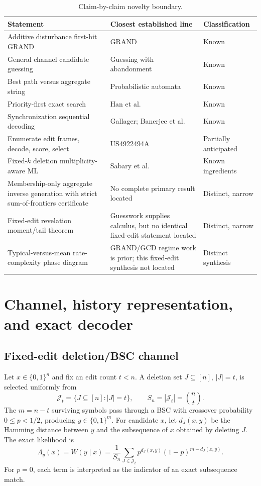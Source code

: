 \documentclass[11pt]{article}
\theoremstyle{definition}
\theoremstyle{remark}
\newcommand{\J}{\mathcal J}
\begin{document}
\begin{table}[t]
\centering
\caption{Claim-by-claim novelty boundary.}
\small
\begin{tabularx}{\textwidth}{@{}p{}p{}X@{}}
\toprule
Statement & Closest established line & Classification \\
\midrule
Additive disturbance first-hit GRAND & GRAND \cite{Duffy2019} & Known \\
General channel candidate guessing & Guessing with abandonment \cite{TanJoudeh2025} & Known \\
Best path versus aggregate string & Probabilistic automata \cite{HigueraOncina2014} & Known \\
Priority-first exact search & Han et al. \cite{Han1993} & Known \\
Synchronization sequential decoding & Gallager; Banerjee et al. \cite{Gallager1961,Banerjee2022} & Known \\
Enumerate edit frames, decode, score, select & US4922494A \cite{US4922494} & Partially anticipated \\
Fixed-$k$ deletion multiplicity-aware ML & Sabary et al. \cite{Sabary2022} & Known ingredients \\
Membership-only aggregate inverse generation with strict sum-of-frontiers certificate & No complete primary result located & Distinct, narrow \\
Fixed-edit revelation moment/tail theorem & Guesswork supplies calculus, but no identical fixed-edit statement located & Distinct, narrow \\
Typical-versus-mean rate-complexity phase diagram & GRAND/GCD regime work is prior; this fixed-edit synthesis not located & Distinct synthesis \\
\bottomrule
\end{tabularx}
\end{table}

\section{Channel, history representation, and exact decoder}
\subsection{Fixed-edit deletion/BSC channel}
Let $x\in\{0,1\}^n$ and fix an edit count $t<n$.  A deletion set $J\subseteq[n]$, $|J|=t$, is selected uniformly from
\[
\J_t=\{J\subseteq[n]:|J|=t\},\qquad S_n=|\J_t|=\binom nt.
\]
The $m=n-t$ surviving symbols pass through a BSC with crossover probability $0\le p<1/2$, producing $y\in\{0,1\}^m$.  For candidate $x$, let $d_J(x,y)$ be the Hamming distance between $y$ and the subsequence of $x$ obtained by deleting $J$.  The exact likelihood is
\begin{equation}
\Lambda_y(x)=W(y\mid x)=\frac1{S_n}\sum_{J\in\J_t}p^{d_J(x,y)}(1-p)^{m-d_J(x,y)}.
\label{eq:likelihood}
\end{equation}
For $p=0$, each term is interpreted as the indicator of an exact subsequence match.
\end{document}
